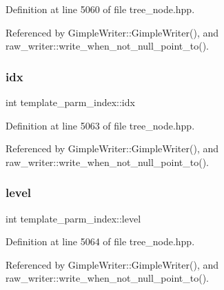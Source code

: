 Definition at line 5060 of file tree\+\_\+node.\+hpp.



Referenced by Gimple\+Writer\+::\+Gimple\+Writer(), and raw\+\_\+writer\+::write\+\_\+when\+\_\+not\+\_\+null\+\_\+point\+\_\+to().

\mbox{\label{structtemplate__parm__index_a3bfa5843f69c40eea9ea8592ce575377}} 
\subsubsection{\texorpdfstring{idx}{idx}}
{\footnotesize\ttfamily int template\+\_\+parm\+\_\+index\+::idx}



Definition at line 5063 of file tree\+\_\+node.\+hpp.



Referenced by Gimple\+Writer\+::\+Gimple\+Writer(), and raw\+\_\+writer\+::write\+\_\+when\+\_\+not\+\_\+null\+\_\+point\+\_\+to().

\mbox{\label{structtemplate__parm__index_a15d8c42251ff2e713348329721ac15e4}} 
\subsubsection{\texorpdfstring{level}{level}}
{\footnotesize\ttfamily int template\+\_\+parm\+\_\+index\+::level}



Definition at line 5064 of file tree\+\_\+node.\+hpp.



Referenced by Gimple\+Writer\+::\+Gimple\+Writer(), and raw\+\_\+writer\+::write\+\_\+when\+\_\+not\+\_\+null\+\_\+point\+\_\+to().

\mbox{\label{structtemplate__parm__index_a144bc4e209141dbcf1072b1a71e810ae}} 
